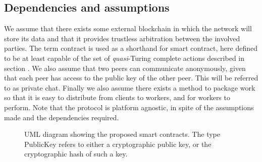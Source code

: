 \subsection{Dependencies and assumptions}
\label{sec:res:dependencies}
We assume that there exists some external blockchain in which the network will store its data and that it provides trustless arbitration between the involved parties. The term contract is used as a shorthand for smart contract, here defined to be at least capable of the set of \textit{quasi}-Turing complete actions described in section . We also assume that two peers can communicate anonymously, given that each peer has access to the public key of the other peer. This will be referred to as private chat. Finally we also assume there exists a method to package work so that it is easy to distribute from clients to workers, and for workers to perform.
Note that the protocol is platform agnostic, in spite of the assumptions made and the dependencies required.

\begin{figure}[ht]
\centering
{}
\caption{UML diagram showing the proposed smart contracts. The type PublicKey refers to either a cryptographic public key, or the cryptographic hash of such a key.}
\label{fig:res:umal}
\end{figure}


